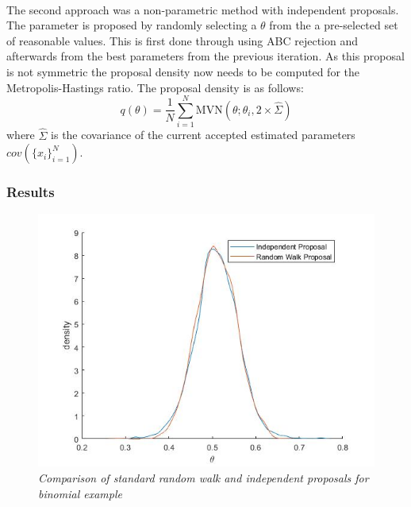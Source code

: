 \documentclass[12,fleqn]{article}
\theoremstyle{definition}
\theoremstyle{plain}
\begin{document}
\paragraph{}
The second approach was a non-parametric method with independent proposals. 
The parameter is proposed by randomly selecting a $\theta$ from the a pre-selected set of reasonable values. This is first done through using ABC rejection and afterwards from the best parameters from the previous iteration. As this proposal is not symmetric the proposal density now needs to be computed for the Metropolis-Hastings ratio. The proposal density is as follows:
\begin{equation*}
q(\theta) = \frac{1}{N} \sum_{i=1}^N \text{MVN}\left( \theta; \theta_i, 2 \times \hat{\Sigma}\right)
\end{equation*}
where $\hat{\Sigma}$ is the covariance of the current accepted estimated parameters $cov(\{x_i\}^N_{i=1})$. 
\par


\subsubsection{Results}

\begin{figure}[H]
\centering
\includegraphics[scale = 0.5]{binomial_comparison.jpg}
\caption{\textit{Comparison of standard random walk and independent proposals for binomial example}}
\end{figure}
\end{document}
